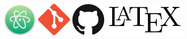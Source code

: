 \begin{figure}[t]
  \centering
  \newcommand{\managementToolsLogosHeight}{1.7cm}
  \includegraphics[height=\managementToolsLogosHeight]{assets/tools/management/atom.png}
  \includegraphics[height=\managementToolsLogosHeight]{assets/tools/management/git.png}
  \includegraphics[height=\managementToolsLogosHeight]{assets/tools/management/github.png}
  \includegraphics[height=\managementToolsLogosHeight]{assets/tools/management/latex.png}

\end{figure}
